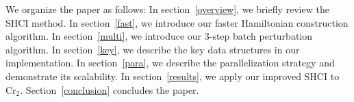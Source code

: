 \documentclass[%
reprint,
 superscriptaddress,
 amsmath,amssymb,
 aps,
]{revtex4-1}
\begin{document}


We organize the paper as follows:
In section~\ref{overview}, we briefly review the SHCI method.
In section~\ref{fast}, we introduce our faster Hamiltonian construction algorithm.
In section~\ref{multi}, we introduce our 3-step batch perturbation algorithm.
In section~\ref{key}, we describe the key data structures in our implementation.
In section~\ref{para}, we describe the parallelization strategy and demonstrate its scalability.
In section~\ref{results}, we apply our improved SHCI to Cr$_2$.
Section~\ref{conclusion} concludes the paper.


\end{document}
